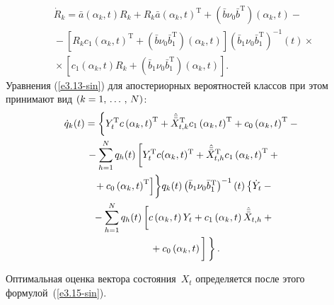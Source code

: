 \begin{multicols}{2}
    \vspace*{-12pt}
    
    \noindent
    \begin{multline}
\dot R_k = \bar a\left(\alpha_k,t\right) R_k + R_k \bar a \left(\alpha_k,t\right)^{\mathrm{T}} + 
\left(\bar b\nu_0\bar b^{\mathrm{T}}\right)
\left(\alpha_k,t\right) -{}\\
{}- \left[ R_k c_1\left(\alpha_k,t\right)^{\mathrm{T}} + 
 \left(\bar b\nu_0\bar b_1^{\mathrm{T}}\right)\left(\alpha_k,t\right)\right] 
\left(\bar b_1\nu_0\bar b_1^{\mathrm{T}}\right)^{-1} (t)\times{}\\
{}\times \left[ c_1\left(\alpha_k,t\right)R_k +
    \left(\bar b_1\nu_0\bar b_1^{\mathrm{T}}\right) \left(\alpha_k,t\right)\right].
    \label{e3.20-sin}
    \end{multline}
Уравнения (\ref{e3.13-sin}) для апостериорных вероятностей классов при этом
принимают вид $(k=1,\,\ldots\,,\, N)$:
 \begin{multline}
 \hspace*{-3.62953pt}\dot q_k (t) = \biggl\{ Y_t^{\mathrm{T}} c\left(\alpha_k,t\right)^{\mathrm{T}} +\hat{\bar{\bar X}}_{t,k}^{\mathrm{T}} c_1\left(\alpha_k,t\right)^{\mathrm{T}} + 
    c_0 \left(\alpha_k,t\right)^{\mathrm{T}} -{}\\
{}-\sss_{h=1}^N q_h (t) \left[ Y_t^{\mathrm{T}} c(\alpha_k,t)^{\mathrm{T}} + \hat{\bar{\bar X}}_{t,h}^{\mathrm{T}} c_1\left(\alpha_k,t\right)^{\mathrm{T}}
    +{}\right.\\
\left.    {}+ c_0 \left(\alpha_k,t\right)^{\mathrm{T}} \right]\biggr\} 
 q_k (t) \left(\bar b_1\nu_0\bar b_1^{\mathrm{T}}\right)^{-1} (t)
 \left\{ 
 \dot Y_t -{}\right.\\
{}-\sss_{h=1}^N q_h(t)\left[ c\left(\alpha_k,t\right)Y_t +
    c_1 \left(\alpha_k,t\right)\hat{\bar{\bar X}}_{t,h} +{}\right.\\
\left.\left.    {}+ c_0\left(\alpha_k,t\right)
\vphantom{\hat{\bar{\bar X}}_{t,h}}
\right] 
\vphantom{\left(\bar b_1\nu_0\bar b_1^{\mathrm{T}}\right)^{-1}}
\right\}.
    \label{e3.21-sin}
    \end{multline}


Оптимальная оценка вектора состояния~$X_t$ определяется после
этого формулой~(\ref{e3.15-sin}).
     
   \smallskip


\end{multicols}

